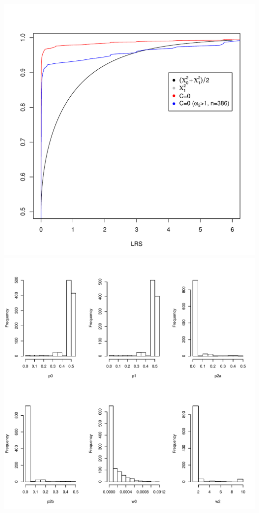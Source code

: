 \documentclass[12pt,letterpaper]{article}\usepackage[]{graphicx}\usepackage[]{color}
\makeatletter
\def\maxwidth{ %
  \ifdim\Gin@nat@width>\linewidth
    \linewidth
  \else
    \Gin@nat@width
  \fi
}
\newenvironment{knitrout}{}{} %
\makeatother
\begin{document}
\begin{knitrout}
\color{fgcolor}

{\centering \includegraphics[width=\maxwidth]{figures/data-1} 
\includegraphics[width=\maxwidth]{figures/data-2} 

}



\end{knitrout}
\end{document}
